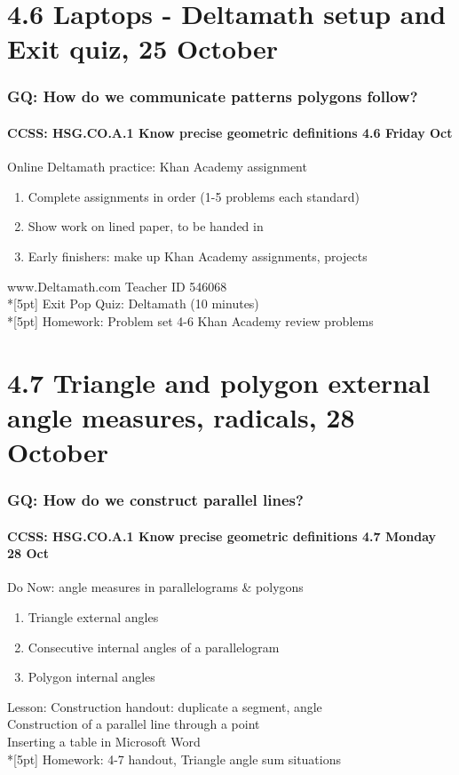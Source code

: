 \documentclass{beamer}
\begin{document}
\section{4.6 Laptops - Deltamath setup and Exit quiz, 25 October}
\frame
{
  \frametitle{GQ: How do we communicate patterns polygons follow?}
  \framesubtitle{CCSS: HSG.CO.A.1 Know precise geometric definitions \hfill \alert{4.6 Friday Oct}}

  \begin{block}{Online Deltamath practice: Khan Academy assignment}
  \begin{enumerate}
    \item Complete assignments in order (1-5 problems each standard)
    \item Show work on lined paper, to be handed in
    \item Early finishers: make up Khan Academy assignments, projects
  \end{enumerate}
  \end{block}
  www.Deltamath.com Teacher ID \alert{546068}\\*[5pt]
  Exit \alert{Pop Quiz}: Deltamath (10 minutes) \\*[5pt]
  Homework: Problem set 4-6 Khan Academy review problems
}

\section{4.7 Triangle and polygon external angle measures, radicals, 28 October}
\frame
{
  \frametitle{GQ: How do we construct parallel lines?}
  \framesubtitle{CCSS: HSG.CO.A.1 Know precise geometric definitions \hfill \alert{4.7 Monday 28 Oct}}

  \begin{block}{Do Now: angle measures in parallelograms \& polygons}
  \begin{enumerate}
    \item Triangle external angles
    \item Consecutive internal angles of a parallelogram
    \item Polygon internal angles
  \end{enumerate}
  \end{block}
  Lesson: Construction handout: duplicate a segment, angle \\
  Construction of a parallel line through a point\\
  Inserting a table in Microsoft Word \\*[5pt]
  Homework: 4-7 handout, Triangle angle sum situations
}
\end{document}
